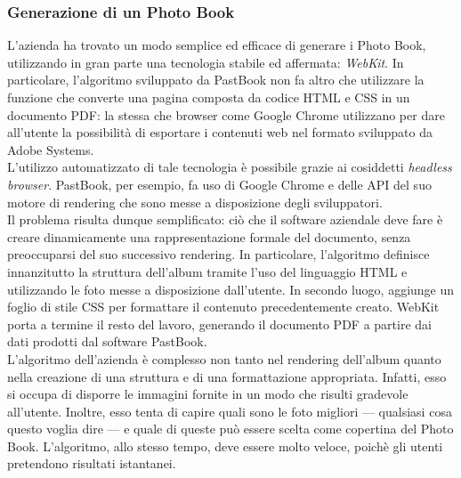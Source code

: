 			\subsubsection{Generazione di un Photo Book}
				L'azienda ha trovato un modo semplice ed efficace di generare i Photo Book, utilizzando in gran parte una tecnologia
				stabile ed affermata: \emph{WebKit}. In particolare, l'algoritmo sviluppato da
				PastBook non fa altro che utilizzare la funzione che converte una pagina composta da codice HTML e CSS in un
				documento PDF: la stessa che browser come Google Chrome utilizzano per dare all'utente la possibilità di esportare i
				contenuti web nel formato sviluppato da Adobe Systems.\\
				L'utilizzo automatizzato di tale tecnologia è possibile grazie ai cosiddetti
				\emph{headless browser}. PastBook, per esempio, fa uso di Google Chrome
				e delle API del suo motore di rendering che sono messe a disposizione degli sviluppatori.\\
				Il problema risulta dunque semplificato: ciò che il software aziendale deve fare è creare dinamicamente una
				rappresentazione formale del documento, senza preoccuparsi del suo successivo rendering. In particolare, l'algoritmo
				definisce innanzitutto la struttura dell'album tramite l'uso del linguaggio HTML e utilizzando le foto messe a
				disposizione dall'utente. In secondo luogo, aggiunge un foglio di stile CSS per formattare il contenuto
				precedentemente creato. WebKit porta a termine il resto del lavoro, generando il documento PDF a partire dai dati
				prodotti dal software PastBook.\\
				L'algoritmo dell'azienda è complesso non tanto nel rendering dell'album quanto nella creazione di una struttura e di
				una formattazione appropriata. Infatti, esso si occupa di disporre le immagini fornite in un modo che risulti
				gradevole all'utente. Inoltre, esso tenta di capire quali sono le foto migliori — qualsiasi cosa questo voglia dire —
				e quale di queste può essere scelta come copertina del Photo Book. L'algoritmo, allo stesso tempo, deve essere molto
				veloce, poichè gli utenti pretendono risultati istantanei.
